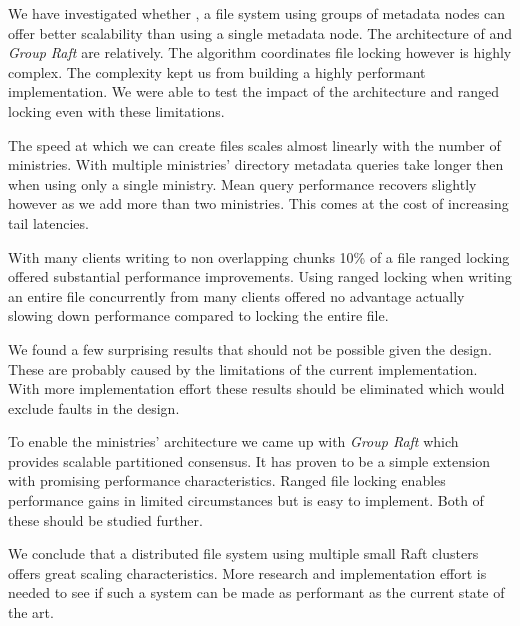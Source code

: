 We have investigated whether \name{}, a file system using groups of metadata nodes can offer better scalability than using a single metadata node. The architecture of \name{} and \textit{Group Raft} are relatively. The algorithm coordinates file locking however is highly complex. The complexity kept us from building a highly performant implementation. We were able to test the impact of the architecture and ranged locking even with these limitations.

The speed at which we can create files scales almost linearly with the number of ministries. With multiple ministries' directory metadata queries take longer then when using only a single ministry. Mean query performance recovers slightly however as we add more than two ministries. This comes at the cost of increasing tail latencies.

With many clients writing to non overlapping chunks 10\% of a file ranged locking offered substantial performance improvements. Using ranged locking when writing an entire file concurrently from many clients offered no advantage actually slowing down performance compared to locking the entire file.

We found a few surprising results that should not be possible given the design. These are probably caused by the limitations of the current implementation. With more implementation effort these results should be eliminated which would exclude faults in the design.

To enable the ministries' architecture we came up with \textit{Group Raft} which provides scalable partitioned consensus. It has proven to be a simple extension with promising performance characteristics. Ranged file locking enables performance gains in limited circumstances but is easy to implement. Both of these should be studied further. 

We conclude that a distributed file system using multiple small Raft clusters offers great scaling characteristics. More research and implementation effort is needed to see if such a system can be made as performant as the current state of the art.
